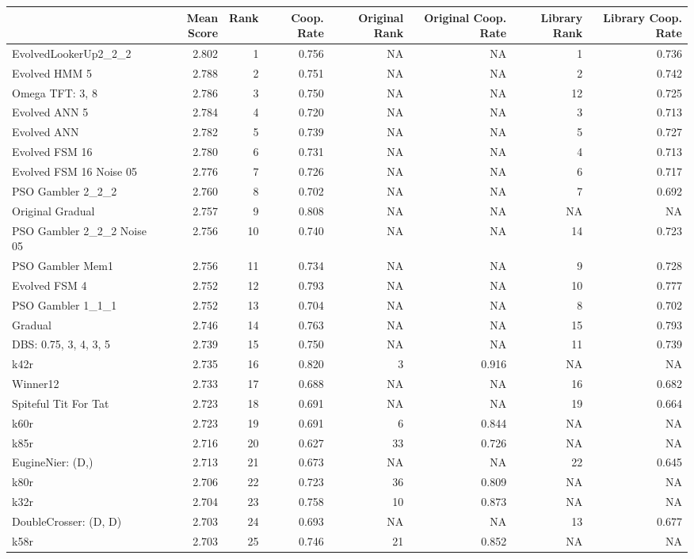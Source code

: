 \begin{tabular}{lrrrrrrr}
\toprule
 & Mean Score & Rank & Coop. Rate & Original Rank & Original Coop. Rate & Library Rank & Library Coop. Rate \\
\midrule
EvolvedLookerUp2\_2\_2 & 2.802 & 1 & 0.756 & NA & NA & 1 & 0.736 \\
Evolved HMM 5 & 2.788 & 2 & 0.751 & NA & NA & 2 & 0.742 \\
Omega TFT: 3, 8 & 2.786 & 3 & 0.750 & NA & NA & 12 & 0.725 \\
Evolved ANN 5 & 2.784 & 4 & 0.720 & NA & NA & 3 & 0.713 \\
Evolved ANN & 2.782 & 5 & 0.739 & NA & NA & 5 & 0.727 \\
Evolved FSM 16 & 2.780 & 6 & 0.731 & NA & NA & 4 & 0.713 \\
Evolved FSM 16 Noise 05 & 2.776 & 7 & 0.726 & NA & NA & 6 & 0.717 \\
PSO Gambler 2\_2\_2 & 2.760 & 8 & 0.702 & NA & NA & 7 & 0.692 \\
Original Gradual & 2.757 & 9 & 0.808 & NA & NA & NA & NA \\
PSO Gambler 2\_2\_2 Noise 05 & 2.756 & 10 & 0.740 & NA & NA & 14 & 0.723 \\
PSO Gambler Mem1 & 2.756 & 11 & 0.734 & NA & NA & 9 & 0.728 \\
Evolved FSM 4 & 2.752 & 12 & 0.793 & NA & NA & 10 & 0.777 \\
PSO Gambler 1\_1\_1 & 2.752 & 13 & 0.704 & NA & NA & 8 & 0.702 \\
Gradual & 2.746 & 14 & 0.763 & NA & NA & 15 & 0.793 \\
DBS: 0.75, 3, 4, 3, 5 & 2.739 & 15 & 0.750 & NA & NA & 11 & 0.739 \\
k42r & 2.735 & 16 & 0.820 & 3 & 0.916 & NA & NA \\
Winner12 & 2.733 & 17 & 0.688 & NA & NA & 16 & 0.682 \\
Spiteful Tit For Tat & 2.723 & 18 & 0.691 & NA & NA & 19 & 0.664 \\
k60r & 2.723 & 19 & 0.691 & 6 & 0.844 & NA & NA \\
k85r & 2.716 & 20 & 0.627 & 33 & 0.726 & NA & NA \\
EugineNier: (D,) & 2.713 & 21 & 0.673 & NA & NA & 22 & 0.645 \\
k80r & 2.706 & 22 & 0.723 & 36 & 0.809 & NA & NA \\
k32r & 2.704 & 23 & 0.758 & 10 & 0.873 & NA & NA \\
DoubleCrosser: (D, D) & 2.703 & 24 & 0.693 & NA & NA & 13 & 0.677 \\
k58r & 2.703 & 25 & 0.746 & 21 & 0.852 & NA & NA \\
\bottomrule
\end{tabular}
